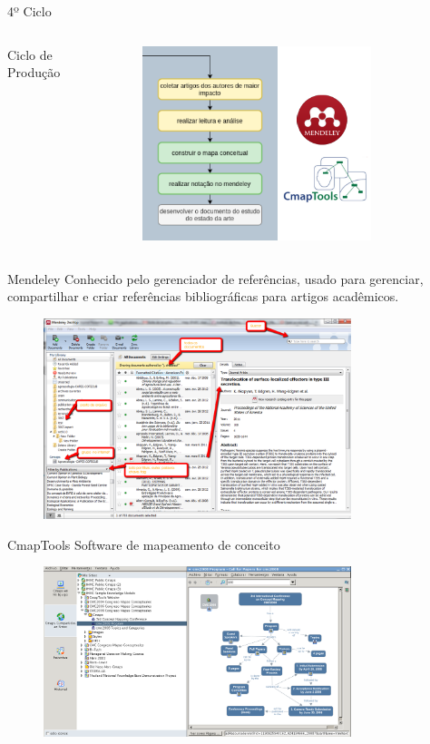 \begin{frame}{4º Ciclo}
	\begin{columns}
        Ciclo de Produção
		\begin{figure}[hb]
      \includegraphics[width=0.8\textwidth]{figures/ciclo4.png}
		\end{figure}
	\end{columns}
\end{frame}

\begin{frame}{Mendeley}
	Conhecido pelo gerenciador de referências, usado para gerenciar, compartilhar e criar referências bibliográficas para artigos acadêmicos.

	\begin{figure}[hb]
		\includegraphics[width=0.8\textwidth]{figures/mendeley.png}
	\end{figure}
\end{frame}

\begin{frame}{CmapTools}
	Software de mapeamento de conceito

	\begin{figure}[hb]
		\includegraphics[width=0.8\textwidth]{figures/cmaptools.png}
	\end{figure}
\end{frame}